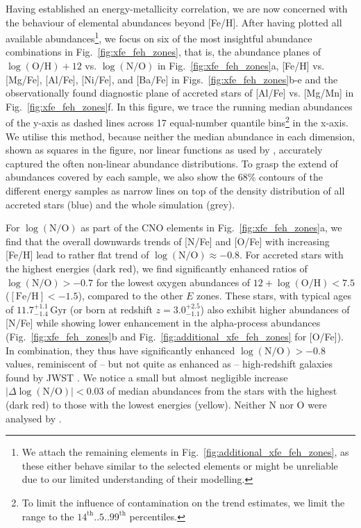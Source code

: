 \documentclass[fleqn,usenatbib]{mnras}
\begin{document}
Having established an energy-metallicity correlation, we are now concerned with the behaviour of elemental abundances beyond [Fe/H]. After having plotted all available abundances\footnote{We attach the remaining elements in Fig.~\ref{fig:additional_xfe_feh_zones}, as these either behave similar to the selected elements or might be unreliable due to our limited understanding of their modelling.}, we focus on six of the most insightful abundance combinations in Fig.~\ref{fig:xfe_feh_zones}, that is, the abundance planes of $\log(\mathrm{O/H}) + 12$ vs. $\log(\mathrm{N/O})$ in Fig.~\ref{fig:xfe_feh_zones}a, [Fe/H] vs. [Mg/Fe], [Al/Fe], [Ni/Fe], and [Ba/Fe] in Figs.~\ref{fig:xfe_feh_zones}b-e and the observationally found diagnostic plane of accreted stars of [Al/Fe] vs. [Mg/Mn] \citep{Hawkins2015, Das2020} in Fig.~\ref{fig:xfe_feh_zones}f. In this figure, we trace the running median abundances of the y-axis as dashed lines across 17 equal-number quantile bins\footnote{To limit the influence of contamination on the trend estimates, we limit the range to the $14^\mathrm{th}..5..99^\mathrm{th}$ percentiles.} in the x-axis. We utilise this method, because neither the median abundance in each dimension, shown as squares in the figure, nor linear functions as used by \citet{Skuladottir2025}, accurately captured the often non-linear abundance distributions. To grasp the extend of abundances covered by each sample, we also show the 68\% contours of the different energy samples as narrow lines on top of the density distribution of all accreted stars (blue) and the whole simulation (grey).

For $\log(\mathrm{N/O})$ as part of the CNO elements in Fig.~\ref{fig:xfe_feh_zones}a, we find that the overall downwards trends of [N/Fe] and [O/Fe] with increasing [Fe/H] lead to rather flat trend of $\log(\mathrm{N/O}) \approx -0.8$. For accreted stars with the highest energies (dark red), we find significantly enhanced ratios of $\log(\mathrm{N/O}) > -0.7$ for the lowest oxygen abundances of $12 + \log(\mathrm{O/H}) < 7.5$ ($\mathrm{[Fe/H]} < -1.5$), compared to the other $E$ zones. These stars, with typical ages of $11.7_{-1.4}^{+1.1}\,\mathrm{Gyr}$ (or born at redshift $z = 3.0_{-1.1}^{+2.5}$) also exhibit higher abundances of [N/Fe] while showing lower enhancement in the alpha-process abundances (Fig.~\ref{fig:xfe_feh_zones}b and Fig.~\ref{fig:additional_xfe_feh_zones} for [O/Fe]). In combination, they thus have significantly enhanced $\log(\mathrm{N/O}) > -0.8$ values, reminiscent of -- but not quite as enhanced as -- high-redshift galaxies found by JWST \citep{Cameron2023, Senchyna2024, Ji2025}. We notice a small but almost negligible increase $\vert\Delta\log(\mathrm{N/O})\vert < 0.03$ of median abundances from the stars with the highest (dark red) to those with the lowest energies (yellow). Neither N nor O were analysed by \citet{Skuladottir2025}.
\end{document}
